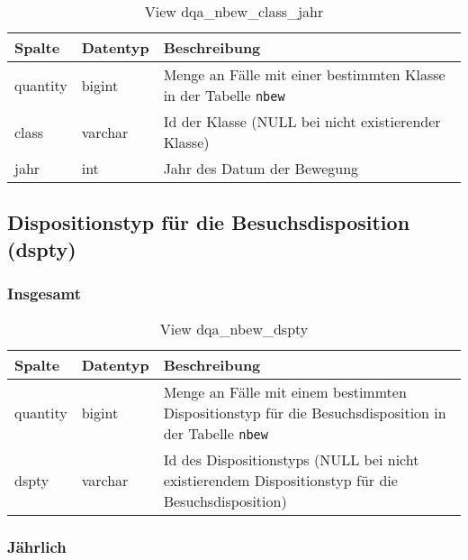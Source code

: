 \begin{table}[ht]
	\centering   
	\caption{View dqa\_nbew\_class\_jahr}
	\label{tab:bewClassJ}
	\begin{tabular}{||l|l|p{10cm}||}   		
		\hline
		Spalte & Datentyp & Beschreibung \\ [0.5ex]
		\hline\hline
		quantity & bigint & Menge an Fälle mit einer bestimmten Klasse in der Tabelle \texttt{nbew}\\
		\hline
		class & varchar & Id der Klasse (NULL bei nicht existierender Klasse)\\
		\hline
		jahr & int &  Jahr des Datum der Bewegung \\
		\hline		
	\end{tabular}
\end{table}

\newpage

\subsection{Dispositionstyp für die Besuchsdisposition (dspty)} \label{subsec:bewdspty}

\subsubsection{Insgesamt} \label{subsubsec:bewDsptyI}

\begin{table}[ht]
	\centering   
	\caption{View dqa\_nbew\_dspty}
	\label{tab:bewDsptyI}
	\begin{tabular}{||l|l|p{10cm}||}   		
		\hline
		Spalte & Datentyp & Beschreibung \\ [0.5ex]
		\hline\hline
		quantity & bigint & Menge an Fälle mit einem bestimmten Dispositionstyp für die Besuchsdisposition in der Tabelle \texttt{nbew} \\
		\hline
		dspty & varchar & Id des Dispositionstyps (NULL bei nicht existierendem Dispositionstyp für die Besuchsdisposition)\\
		\hline
		
	\end{tabular}
\end{table}

\subsubsection{Jährlich} \label{subsubsec:bewDsptyJ}

